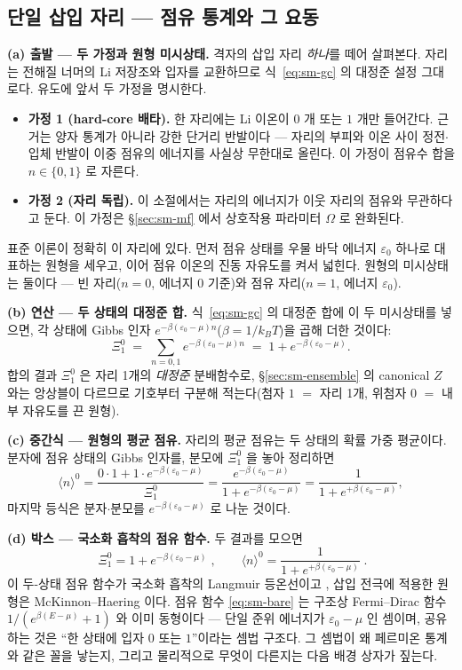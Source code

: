 \subsection{단일 삽입 자리 --- 점유 통계와 그 요동}\label{sec:sm-site}
\textbf{(a) 출발 --- 두 가정과 원형 미시상태.} 격자의 삽입 자리 \emph{하나}를 떼어 살펴본다.
자리는 전해질 너머의 Li 저장조와 입자를 교환하므로 식~\eqref{eq:sm-gc} 의 대정준 설정 그대로다. 유도에
앞서 두 가정을 명시한다.
\begin{itemize}[leftmargin=2.2em,itemsep=0.1em]
\item \textbf{가정 1 (hard-core 배타).} 한 자리에는 Li 이온이 $0$ 개 또는 $1$ 개만 들어간다. 근거는 양자
통계가 아니라 강한 단거리 반발이다 --- 자리의 부피와 이온 사이 정전$\cdot$입체 반발이 이중 점유의
에너지를 사실상 무한대로 올린다. 이 가정이 점유수 합을 $n\in\{0,1\}$ 로 자른다.
\item \textbf{가정 2 (자리 독립).} 이 소절에서는 자리의 에너지가 이웃 자리의 점유와 무관하다고 둔다.
이 가정은 \S\ref{sec:sm-mf} 에서 상호작용 파라미터 $\Omega$ 로 완화된다.
\end{itemize}
표준 이론이 정확히 이 자리에 있다. 먼저 점유 상태를 우물 바닥 에너지 $\varepsilon_0$ 하나로 대표하는
원형을 세우고, 이어 점유 이온의 진동 자유도를 켜서 넓힌다. 원형의 미시상태는 둘이다 --- 빈 자리($n=0$,
에너지 $0$ 기준)와 점유 자리($n=1$, 에너지 $\varepsilon_0$).

\textbf{(b) 연산 --- 두 상태의 대정준 합.} 식~\eqref{eq:sm-gc} 의 대정준 합에 이 두 미시상태를 넣으면, 각
상태에 Gibbs 인자 $e^{-\beta(\varepsilon_0-\mu)n}$($\beta=1/k_BT$)을 곱해 더한 것이다:
\[
\Xi_1^{0}\;=\;\sum_{n=0,1}e^{-\beta(\varepsilon_0-\mu)n}
\;=\;1+e^{-\beta(\varepsilon_0-\mu)}.
\]
합의 결과 $\Xi_1^{0}$ 은 자리 1개의 \emph{대정준} 분배함수로, \S\ref{sec:sm-ensemble} 의 canonical $Z$ 와는
앙상블이 다르므로 기호부터 구분해 적는다(첨자 $1$ $=$ 자리 1개, 위첨자 $0$ $=$ 내부 자유도를 끈 원형).

\textbf{(c) 중간식 --- 원형의 평균 점유.} 자리의 평균 점유는 두 상태의 확률 가중 평균이다. 분자에 점유
상태의 Gibbs 인자를, 분모에 $\Xi_1^{0}$ 을 놓아 정리하면
\[
\langle n\rangle^{0}
=\frac{0\cdot1+1\cdot e^{-\beta(\varepsilon_0-\mu)}}{\Xi_1^{0}}
=\frac{e^{-\beta(\varepsilon_0-\mu)}}{1+e^{-\beta(\varepsilon_0-\mu)}}
=\frac{1}{1+e^{+\beta(\varepsilon_0-\mu)}},
\]
마지막 등식은 분자$\cdot$분모를 $e^{-\beta(\varepsilon_0-\mu)}$ 로 나눈 것이다.

\textbf{(d) 박스 --- 국소화 흡착의 점유 함수.} 두 결과를 모으면
\begin{equation}
\boxed{\;\Xi_1^{0}=1+e^{-\beta(\varepsilon_0-\mu)}\;,\qquad
\langle n\rangle^{0}=\frac{1}{1+e^{+\beta(\varepsilon_0-\mu)}}\;.}
\label{eq:sm-bare}
\end{equation}
이 두-상태 점유 함수가 국소화 흡착의 Langmuir 등온선이고 \cite{hill1960,fowler1939}, 삽입 전극에 적용한
원형은 McKinnon--Haering \cite{mckinnon1983} 이다. 점유 함수 \eqref{eq:sm-bare} 는 구조상 Fermi--Dirac
함수 $1/(e^{\beta(E-\mu)}+1)$ 와 이미 동형이다 --- 단일 준위 에너지가 $\varepsilon_0-\mu$ 인 셈이며,
공유하는 것은 ``한 상태에 입자 $0$ 또는 $1$''이라는 셈법 구조다. 그 셈법이 왜 페르미온 통계와 같은 꼴을
낳는지, 그리고 물리적으로 무엇이 다른지는 다음 배경 상자가 짚는다.

